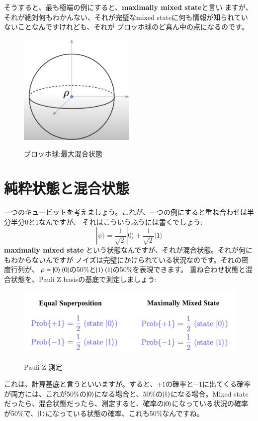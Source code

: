 そうすると、最も極端の例にすると、\textbf{maximally mixed state}と言い
ますが、それが絶対何もわかんない、それが完璧なmixed stateに何も情報が知られていないことなんですけれども、それが
ブロッホ球のど真ん中の点になるのです。
\begin{figure}[H]
    \centering
    \includegraphics[width=0.5\textwidth]{lesson3/bloch_maximally_mixed_state.pdf}
    \label{fig: 1}
    \begin{center}
        \caption{ブロッホ球:最大混合状態}
    \end{center}
\end{figure}

\section{純粋状態と混合状態}
一つのキュービットを考えましょう。これが、一つの例にすると重ね合わせは半分半分0と1なんですが、
それはこういうふうには書くでしょう:
\begin{equation}
|\psi\rangle=\frac{1}{\sqrt{2}}|0\rangle+\frac{1}{\sqrt{2}}|1\rangle
\end{equation}
\textbf{maximally mixed state} という状態なんですが、それが混合状態。それが何にもわからないんですが
ノイズは完璧にかけられている状況なのです。それの密度行列が、
$\rho = \ket{0}\bra{0}$の50\%と$\ket{1}\bra{1}$の50\%を表現できます。
重ね合わせ状態と混合状態を、Pauli Z basisの基底で測定しましょう:
\begin{figure}[H]
    \centering
    \includegraphics[width=1.0\textwidth]{lesson3/pauli_z_measurement.pdf}
    \label{fig: 1}
    \begin{center}
        \caption{Pauli Z 測定}
    \end{center}
\end{figure}
これは、計算基底と言うといいますが。すると、$+1$の確率と$-1$に出てくる確率が両方には、これが50\%の$\ket{0}$になる場合と、50\%の$\ket{1}$になる場合。Mixed stateだったら、混合状態だったら、測定すると、確率の$\ket{0}$になっている状況の確率が50\%で、$\ket{1}$になっている状態の確率、これも50\%なんですね。

